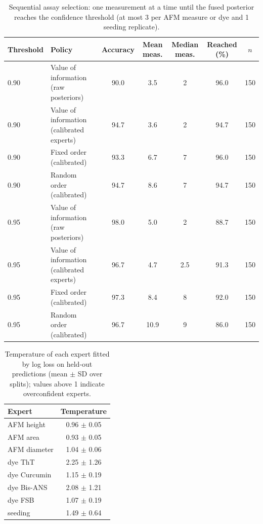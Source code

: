 \begin{table}[!htbp]
\centering\scriptsize
\caption{Sequential assay selection: one measurement at a time until the fused posterior reaches the confidence threshold (at most 3 per AFM measure or dye and 1 seeding replicate).}\label{tab:s_sequential}
\begin{tabular}{llccccc}
\toprule
\textbf{Threshold} & \textbf{Policy} & \textbf{Accuracy} & \textbf{Mean meas.} & \textbf{Median meas.} & \textbf{Reached (\%)} & \textbf{$n$} \\
\midrule
0.90 & Value of information (raw posteriors) & 90.0 & 3.5 & 2 & 96.0 & 150 \\
0.90 & Value of information (calibrated experts) & 94.7 & 3.6 & 2 & 94.7 & 150 \\
0.90 & Fixed order (calibrated) & 93.3 & 6.7 & 7 & 96.0 & 150 \\
0.90 & Random order (calibrated) & 94.7 & 8.6 & 7 & 94.7 & 150 \\
0.95 & Value of information (raw posteriors) & 98.0 & 5.0 & 2 & 88.7 & 150 \\
0.95 & Value of information (calibrated experts) & 96.7 & 4.7 & 2.5 & 91.3 & 150 \\
0.95 & Fixed order (calibrated) & 97.3 & 8.4 & 8 & 92.0 & 150 \\
0.95 & Random order (calibrated) & 96.7 & 10.9 & 9 & 86.0 & 150 \\
\bottomrule
\end{tabular}
\end{table}

\begin{table}[!htbp]
\centering\scriptsize
\caption{Temperature of each expert fitted by log loss on held-out predictions (mean $\pm$ SD over splits); values above 1 indicate overconfident experts.}\label{tab:s_temps}
\begin{tabular}{lc}
\toprule
\textbf{Expert} & \textbf{Temperature} \\
\midrule
AFM height & 0.96 $\pm$ 0.05 \\
AFM area & 0.93 $\pm$ 0.05 \\
AFM diameter & 1.04 $\pm$ 0.06 \\
dye ThT & 2.25 $\pm$ 1.26 \\
dye Curcumin & 1.15 $\pm$ 0.19 \\
dye Bis-ANS & 2.08 $\pm$ 1.21 \\
dye FSB & 1.07 $\pm$ 0.19 \\
seeding & 1.49 $\pm$ 0.64 \\
\bottomrule
\end{tabular}
\end{table}
